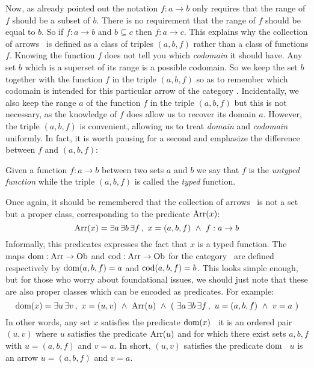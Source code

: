 Now, as already pointed
out the notation $f:a\to b$ only requires that the range of $f$ should be
a subset of $b$. There is no requirement that the range of $f$ should be
equal to $b$. So if $f:a\to b$ and $b\subseteq c$ then $f:a\to c$.
This explains why the collection of arrows \arr\ is defined as a class of 
triples $(a,b,f)$ rather than a class of functions $f$. Knowing the 
function $f$ does not tell you which {\em codomain} it should have. Any 
set $b$ which is a superset of its range is a possible codomain. So we 
keep the set $b$ together with the function $f$ in the triple $(a,b,f)$
so as to remember which codomain is intended for this particular arrow
of the category \Set. Incidentally, we also keep the range $a$ of the 
function $f$ in the triple $(a,b,f)$ but this is not necessary, as the
knowledge of $f$ does allow us to recover its domain $a$. However,
the triple $(a,b,f)$ is convenient, allowing us to treat {\em domain} 
and {\em codomain} uniformly. In fact, it is worth pausing for a second
and emphasize the difference between $f$ and $(a,b,f)$:
\begin{defin}\label{Cat:def:typed:untyped:function}
    Given a function $f:a\to b$ between two sets $a$ and $b$ we say that
    $f$ is the {\em untyped function} while the triple $(a,b,f)$ is called
    the {\em typed} function.
\end{defin}

Once again, it should be remembered that
the collection of arrows \arr\ is not a set but a proper class, 
corresponding to the predicate $\mbox{\rm Arr}(x)$:
    \[
        \mbox{\rm Arr}(x)=\exists a\,\exists b\,\exists f\,,\  
        x = (a,b,f)\ \land\ f : a \to b
    \]
Informally, this predicates expresses the fact that $x$ is a typed function.
The maps $\mbox{\rm dom}:\mbox{\rm Arr}\to\mbox{\rm Ob}$ and $\mbox{\rm cod}:\mbox{\rm Arr}\to\mbox{\rm Ob}$ for the category \Set\
are defined respectively by $\mbox{\rm dom}(a,b,f)=a$ and $\mbox{\rm cod}(a,b,f)=b$. This 
looks simple enough, but for those who worry about foundational issues,
we should just note that these are also proper classes which can be
encoded as predicates. For example:
    \[
    \dom(x)=\exists u\,\exists v\,,\ x = (u,v)\ \land\ \arr(u)\ \land 
    \ (\ \exists a\,\exists b\,\exists f\,,\  u = (a,b,f)\ \land\ 
    v = a\ ) 
    \]
In other words, any set $x$ satisfies the predicate $\mbox{\rm dom}(x)$ \ifand\ 
it is an ordered pair $(u,v)$ where $u$ satisfies the predicate $\mbox{\rm Arr}(u)$
and for which there exist sets $a,b,f$ with $u=(a,b,f)$ and $v=a$.
In short, $(u,v)$ satisfies the predicate $\mbox{\rm dom}$ \ifand\ $u$ is an
arrow $u=(a,b,f)$ and $v=a$.

